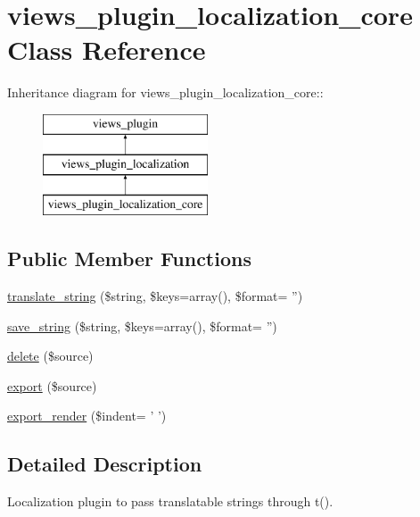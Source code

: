 \hypertarget{classviews__plugin__localization__core}{
\section{views\_\-plugin\_\-localization\_\-core Class Reference}
\label{classviews__plugin__localization__core}
}
Inheritance diagram for views\_\-plugin\_\-localization\_\-core::\begin{figure}[H]
\begin{center}
\leavevmode
\includegraphics[height=3cm]{classviews__plugin__localization__core}
\end{center}
\end{figure}
\subsection*{Public Member Functions}
\begin{DoxyCompactItemize}
\item 
\hyperlink{classviews__plugin__localization__core_a01ca45e9578f631df900513ecceb1616}{translate\_\-string} (\$string, \$keys=array(), \$format= '')
\item 
\hyperlink{classviews__plugin__localization__core_a6d21acdb67193321115f053762f82e35}{save\_\-string} (\$string, \$keys=array(), \$format= '')
\item 
\hyperlink{classviews__plugin__localization__core_a9d1aef13f48d44133c19dcde49c9e123}{delete} (\$source)
\item 
\hyperlink{classviews__plugin__localization__core_aab727cab888d512998e318be557813d7}{export} (\$source)
\item 
\hyperlink{classviews__plugin__localization__core_a40776fb6a694863bfddc44954d1cb187}{export\_\-render} (\$indent= ' ')
\end{DoxyCompactItemize}


\subsection{Detailed Description}
Localization plugin to pass translatable strings through t(). 


